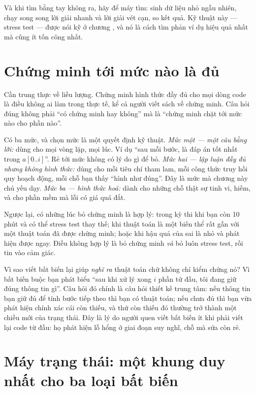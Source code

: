 \documentclass[../../algorithm.tex]{subfiles}
\begin{document}
Và khi tìm bằng tay không ra, hãy để máy tìm: sinh dữ liệu nhỏ ngẫu nhiên, chạy song song lời giải nhanh và lời giải vét cạn, so kết quả. Kỹ thuật này --- stress test --- được nói kỹ ở chương , và nó là cách tìm phản ví dụ hiệu quả nhất mà cũng ít tốn công nhất.

\section{Chứng minh tới mức nào là đủ}

Cần trung thực về liều lượng. Chứng minh hình thức đầy đủ cho mọi dòng code là điều không ai làm trong thực tế, kể cả người viết sách về chứng minh. Câu hỏi đúng không phải ``có chứng minh hay không'' mà là ``chứng minh chặt tới mức nào cho phần nào''.

Có ba mức, và chọn mức là một quyết định kỹ thuật. \emph{Mức một --- một câu bằng lời:} dùng cho mọi vòng lặp, mọi lúc. Ví dụ ``sau mỗi bước,  là đáp án tốt nhất trong \(a[0..i]\)''. Rẻ tới mức không có lý do gì để bỏ. \emph{Mức hai --- lập luận đầy đủ nhưng không hình thức:} dùng cho mỗi tiêu chí tham lam, mỗi công thức truy hồi quy hoạch động, mỗi chỗ bạn thấy ``hình như đúng''. Đây là mức mà chương này chủ yếu dạy. \emph{Mức ba --- hình thức hoá:} dành cho những chỗ thật sự tinh vi, hiếm, và cho phần mềm mà lỗi có giá quá đắt.

Ngược lại, có những lúc bỏ chứng minh là hợp lý: trong kỳ thi khi bạn còn 10 phút và có thể stress test thay thế; khi thuật toán là một biến thể rất gần với một thuật toán đã được chứng minh; hoặc khi hậu quả của sai là nhỏ và phát hiện được ngay. Điều không hợp lý là bỏ chứng minh \emph{và} bỏ luôn stress test, rồi tin vào cảm giác.

\begin{trucgiac}
Vì sao viết bất biến lại giúp \emph{nghĩ ra} thuật toán chứ không chỉ kiểm chứng nó? Vì bất biến buộc bạn phát biểu ``sau khi xử lý xong \(i\) phần tử đầu, tôi đang giữ đúng thông tin gì''. Câu hỏi đó chính là câu hỏi thiết kế trung tâm: nếu thông tin bạn giữ đủ để tính bước tiếp theo thì bạn có thuật toán; nếu chưa đủ thì bạn vừa phát hiện chính xác cái còn thiếu, và thứ còn thiếu đó thường trở thành một chiều mới của trạng thái. Đây là lý do người quen viết bất biến ít khi phải viết lại code từ đầu: họ phát hiện lỗ hổng ở giai đoạn suy nghĩ, chỗ mà sửa còn rẻ.
\end{trucgiac}

\section{Máy trạng thái: một khung duy nhất cho ba loại bất biến}
\end{document}
